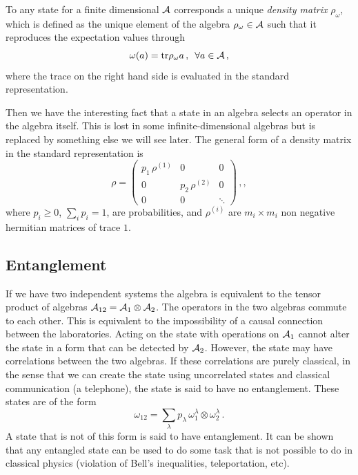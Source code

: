 \documentclass[12pt]{article}
\numberwithin{equation}{section}
\newcommand{\be}{\begin{equation}}
\newcommand{\ee}{\end{equation}}
\begin{document}
To any state for a finite dimensional ${\cal A}$ corresponds a unique {\sl density matrix} $\rho_\omega$, which is defined as the unique element of the algebra $ \rho_\omega\in  {\cal A}$ such that it reproduces the expectation values through  
\begin{equation}
\omega (a)=\textrm{tr} \rho_\omega a\,, \,\,\,\forall a\in {\cal A}\,,
 \end{equation} 
where the trace on the right hand side is evaluated in the standard representation. 

Then we have the interesting fact that a state in an algebra selects an operator in the algebra itself. This is lost in some infinite-dimensional algebras but is replaced by something else we will see later.  
The general form of a density matrix in the standard representation is 
\begin{equation}
\rho= \left(\begin{array}{ccc}
  p_1\, \rho^{(1)} & 0 & 0 \\
  0 & p_2 \, \rho^{(2)} & 0\\
  0 & 0 & \ddots
\end{array}\right)\,,,\label{matrtr}
\end{equation}
where $p_i\ge 0$, $\sum_i p_i=1$, are probabilities, and $\rho^{(i)}$ are $m_i\times m_i$ non negative hermitian matrices of trace $1$. 

\subsection{Entanglement}

If we have two independent systems the algebra is equivalent to the tensor product of algebras ${\cal A}_{12}={\cal A}_1\otimes {\cal A}_2$. The operators in the two algebras commute to each other. This is equivalent to the impossibility of a causal connection between the laboratories. Acting on the state with operations on ${\cal A}_1$ cannot alter the state in a form that can be detected by ${\cal A}_2$. However, the state may have correlations between the two algebras. If these correlations are purely classical, in the sense that we can create the state using uncorrelated states and classical communication (a telephone), the state is said to have no entanglement. These states are of the form
\be
\omega_{12} = \sum_\lambda p_\lambda\, \omega_1^\lambda \otimes \omega_2^\lambda\,.
\ee
A state that is not of this form is said to have entanglement. It can be shown that any entangled state can be used to do some task that is not possible to do in classical physics (violation of Bell's inequalities, teleportation, etc). 
\end{document}
